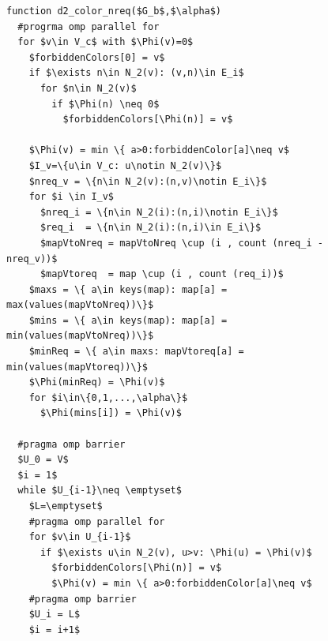 \documentclass[12pt, oneside]{book}
\begin{document}
\begin{figure}
\begin{lstlisting}[caption=New coloring heuristc in the bipartite graph model 
parallelized by OpenMP,label=code.new.bip.omp,mathescape]
function d2_color_nreq($G_b$,$\alpha$)
  #progrma omp parallel for
  for $v\in V_c$ with $\Phi(v)=0$
    $forbiddenColors[0] = v$
    if $\exists n\in N_2(v): (v,n)\in E_i$ 
      for $n\in N_2(v)$
        if $\Phi(n) \neq 0$
          $forbiddenColors[\Phi(n)] = v$

    $\Phi(v) = min \{ a>0:forbiddenColor[a]\neq v$
    $I_v=\{u\in V_c: u\notin N_2(v)\}$
    $nreq_v = \{n\in N_2(v):(n,v)\notin E_i\}$
    for $i \in I_v$
      $nreq_i = \{n\in N_2(i):(n,i)\notin E_i\}$
      $req_i  = \{n\in N_2(i):(n,i)\in E_i\}$ 
      $mapVtoNreq = mapVtoNreq \cup (i , count (nreq_i - nreq_v))$
      $mapVtoreq  = map \cup (i , count (req_i))$
    $maxs = \{ a\in keys(map): map[a] = max(values(mapVtoNreq))\}$
    $mins = \{ a\in keys(map): map[a] = min(values(mapVtoNreq))\}$
    $minReq = \{ a\in maxs: mapVtoreq[a] = min(values(mapVtoreq))\}$
    $\Phi(minReq) = \Phi(v)$
    for $i\in\{0,1,...,\alpha\}$
      $\Phi(mins[i]) = \Phi(v)$

  #pragma omp barrier
  $U_0 = V$
  $i = 1$
  while $U_{i-1}\neq \emptyset$
    $L=\emptyset$
    #pragma omp parallel for
    for $v\in U_{i-1}$
      if $\exists u\in N_2(v), u>v: \Phi(u) = \Phi(v)$
        $forbiddenColors[\Phi(n)] = v$
        $\Phi(v) = min \{ a>0:forbiddenColor[a]\neq v$
    #pragma omp barrier
    $U_i = L$
    $i = i+1$
\end{lstlisting}
\end{figure}
\end{document}
